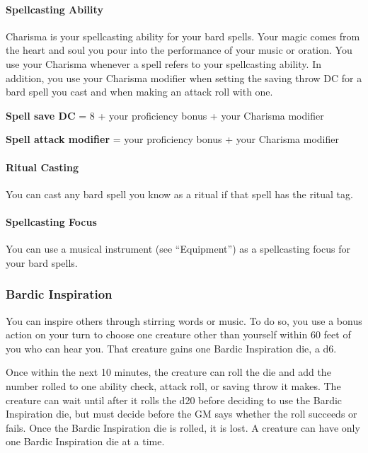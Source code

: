 \hypertarget{spellcasting-ability}{%
\paragraph{Spellcasting Ability}\label{spellcasting-ability}}

Charisma is your spellcasting ability for your bard spells. Your magic
comes from the heart and soul you pour into the performance of your
music or oration. You use your Charisma whenever a spell refers to your
spellcasting ability. In addition, you use your Charisma modifier when
setting the saving throw DC for a bard spell you cast and when making an
attack roll with one.

\textbf{Spell save DC} = 8 + your proficiency bonus + your Charisma
modifier

\textbf{Spell attack modifier} = your proficiency bonus + your Charisma
modifier

\hypertarget{ritual-casting}{%
\paragraph{Ritual Casting}\label{ritual-casting}}

You can cast any bard spell you know as a ritual if that spell has the
ritual tag.

\hypertarget{spellcasting-focus}{%
\paragraph{Spellcasting Focus}\label{spellcasting-focus}}

You can use a musical instrument (see ``Equipment'') as a spellcasting
focus for your bard spells.

\hypertarget{bardic-inspiration}{%
\subsubsection{Bardic Inspiration}\label{bardic-inspiration}}

You can inspire others through stirring words or music. To do so, you
use a bonus action on your turn to choose one creature other than
yourself within 60 feet of you who can hear you. That creature gains one
Bardic Inspiration die, a d6.

Once within the next 10 minutes, the creature can roll the die and add
the number rolled to one ability check, attack roll, or saving throw it
makes. The creature can wait until after it rolls the d20 before
deciding to use the Bardic Inspiration die, but must decide before the
GM says whether the roll succeeds or fails. Once the Bardic Inspiration
die is rolled, it is lost. A creature can have only one Bardic
Inspiration die at a time.

